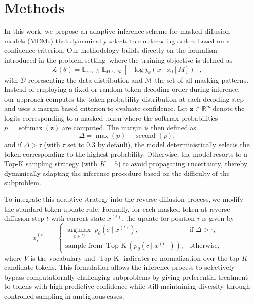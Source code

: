 \documentclass{article}
\begin{document}
\section{Methods}
In this work, we propose an adaptive inference scheme for masked diffusion models (MDMs) that dynamically selects token decoding orders based on a confidence criterion. Our methodology builds directly on the formalism introduced in the problem setting, where the training objective is defined as
\[
\mathcal{L}(\theta) = \mathbb{E}_{x \sim \mathcal{D}} \; \mathbb{E}_{M \sim \mathcal{M}} \left[-\log p_\theta(x \mid x_0[M])\right],
\]
with \(\mathcal{D}\) representing the data distribution and \(\mathcal{M}\) the set of all masking patterns. Instead of employing a fixed or random token decoding order during inference, our approach computes the token probability distribution at each decoding step and uses a margin-based criterion to evaluate confidence. Let \(\mathbf{z} \in \mathbb{R}^{m}\) denote the logits corresponding to a masked token where the softmax probabilities \(p = \operatorname{softmax}(\mathbf{z})\) are computed. The margin is then defined as
\[
\Delta = \max(p) - \operatorname{second}(p),
\]
and if \(\Delta > \tau\) (with \(\tau\) set to 0.3 by default), the model deterministically selects the token corresponding to the highest probability. Otherwise, the model resorts to a Top-K sampling strategy (with \(K=5\)) to avoid propagating uncertainty, thereby dynamically adapting the inference procedure based on the difficulty of the subproblem.

To integrate this adaptive strategy into the reverse diffusion process, we modify the standard token update rule. Formally, for each masked token at reverse diffusion step \(t\) with current state \(x^{(t)}\), the update for position \(i\) is given by
\[
x^{(s)}_i = 
\begin{cases}
\operatorname*{arg\,max}_{c \in V} \; p_\theta(c \mid x^{(t)}), & \text{if } \Delta > \tau, \\[1ex]
\text{sample from } \operatorname{Top\text{-}K}\left(p_\theta(c \mid x^{(t)})\right), & \text{otherwise},
\end{cases}
\]
where \(V\) is the vocabulary and \(\operatorname{Top\text{-}K}\) indicates re-normalization over the top \(K\) candidate tokens. This formulation allows the inference process to selectively bypass computationally challenging subproblems by giving preferential treatment to tokens with high predictive confidence while still maintaining diversity through controlled sampling in ambiguous cases.
\end{document}
